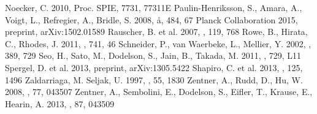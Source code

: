 \begin{thebibliography}{}
  Noecker, C. 2010, Proc. SPIE, 7731, 77311E
  Paulin-Henriksson, S., Amara, A., Voigt, L., Refregier, A., Bridle, S. 2008, \aa, 484, 67
  Planck Collaboration 2015, preprint, arXiv:1502.01589
  Rauscher, B. et al. 2007, \pasp, 119, 768
  Rowe, B., Hirata, C., Rhodes, J. 2011, \apj, 741, 46
  Schneider, P., van Waerbeke, L., Mellier, Y. 2002, \aap, 389, 729
  Seo, H., Sato, M., Dodelson, S., Jain, B., Takada, M. 2011, \apj, 729, L11
  Spergel, D. et al. 2013, preprint, arXiv:1305.5422
  Shapiro, C. et al. 2013, \pasp, 125, 1496
  Zaldarriaga, M. Seljak, U. 1997, \prd, 55, 1830
  Zentner, A., Rudd, D., Hu, W. 2008, \prd, 77, 043507
  Zentner, A., Sembolini, E., Dodelson, S., Eifler, T., Krause, E., Hearin, A. 2013, \prd, 87, 043509
\end{thebibliography}

